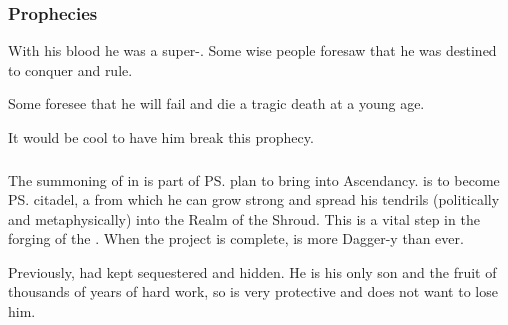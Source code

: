 \subsubsection{Prophecies}
With his \bane{} blood he was a super-\dragon. 
Some wise people foresaw that he was destined to conquer and rule. 


Some foresee that he will fail and die a tragic death at a young age.


It would be cool to have him break this prophecy. 





\subsubsection{\Malcur}
The summoning of \Nithdornazsh in \Malcur is part of \ps{\Secherdamon} plan to bring  into Ascendancy. 
\Nithdornazsh{} is to become \ps{\Vizsherioch} citadel, a \nexus{} from which he can grow strong and spread his tendrils (politically and metaphysically) into the Realm of the Shroud. 
This is a vital step in the forging of the . 
When the \Nithdornazsh{} project is complete, \Vizsherioch{} is more Dagger-y than ever. 

Previously, \Secherdamon{} had kept \Vizsherioch{} sequestered and hidden. 
He is his only son and the fruit of thousands of years of hard work, so \Secherdamon{} is very protective and does not want to lose him. 






